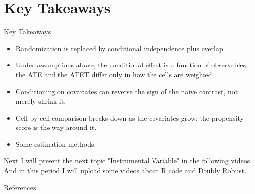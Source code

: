 \documentclass[11pt,aspectratio=169]{beamer}
\begin{document}
\section{Key Takeaways}
\begin{frame}{Key Takeaways}
\begin{itemize}
    \item Randomization is replaced by conditional independence plus overlap.
    \item Under assumptions above, the conditional effect is a function of observables; the ATE and the ATET differ only in how the cells are weighted.
    \item Conditioning on covariates can reverse the sign of the naive contrast, not merely shrink it.
    \item Cell-by-cell comparison breaks down as the covariates grow; the propensity score is the way around it.
    \item Some estimation methods.
\end{itemize}

\end{frame}
\begin{frame}{Next}
I will present the next topic "Instrumental Variable" in the following videos. And in this period I will upload some videos about R code and Doubly Robust.

\end{frame}


\begin{frame}[allowframebreaks,t]{References}
\scriptsize
\setlength{\bibitemsep}{2pt}
\nocite{abadie_imbens_2016,frolich_sperlich_2019,hahn_1998,hirano_imbens_ridder_2003,imbens_rubin_2015,lalonde_1986,manski_1990,rosenbaum_rubin_1983,rothe_2017,wager_2024}
\printbibliography[heading=none]
\end{frame}
\end{document}
